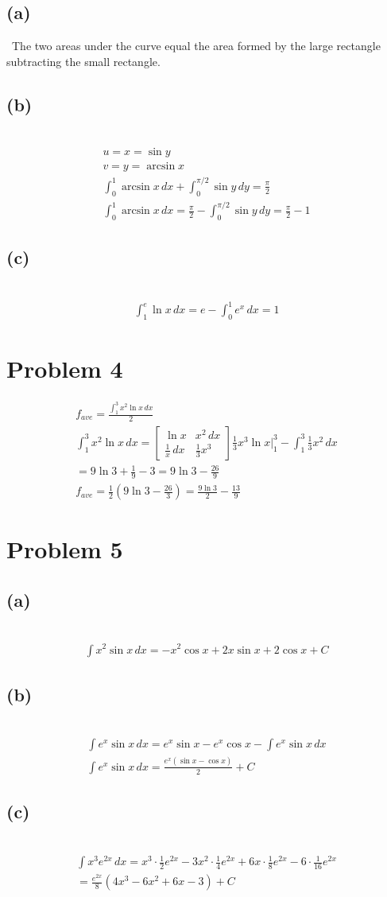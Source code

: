 \documentclass[12pt]{article}
\newcommand{\vem}{\vspace{0.5em}}
\newcommand{\problem}[1]{\section{Problem #1}}
\newcommand{\subproblem}[1]{\subsection{(#1)} \,}
\begin{document}
\subproblem{a}
The two areas under the curve equal the area formed by the large rectangle subtracting the small rectangle. \vem

\subproblem{b}
\begin{gather*}
    u=x=\sin y\\
    v=y=\arcsin x\\
    \int_0^1 \arcsin x\, dx+\int_0^{\pi /2} \sin y \, dy = \frac{\pi}{2}\\
    \int_0^1 \arcsin x\, dx = \frac{\pi }{2} - \int_0^{\pi /2} \sin y \, dy = \boxed{\frac{\pi}{2}-1}
\end{gather*}

\subproblem{c}
\begin{gather*}
    \int_1^e \ln x \, dx = e -\int_0^1 e^x\, dx = \boxed{1}
\end{gather*}

\problem{4}
\begin{gather*}
    f_{ave}=\frac{\int_1^3x^2\ln x\, dx}{2}\\
    \int_1^3x^2\ln x\, dx = 
    \begin{bmatrix}
        \ln x & x^2\, dx\\
        \frac{1}{x}\, dx & \frac{1}{3}x^3\,
    \end{bmatrix}
    \frac{1}{3}x^3\ln x\Big|^3_1 - \int_1^3 \frac{1}{3}x^2 \, dx\\
    = 9 \ln 3 + \frac{1}{9} - 3  = 9 \ln 3 - \frac{26}{9}\\
    f_{ave} = \frac{1}{2}(9 \ln 3 - \frac{26}{3}) = \boxed{\frac{9 \ln 3}{2}- \frac{13}{9}}
\end{gather*}

\problem{5}

\subproblem{a}
\begin{gather*}
    \int x^2 \sin x\, dx = \boxed{- x^2 \cos x + 2x \sin x + 2 \cos x +C}
\end{gather*}

\subproblem{b}
\begin{gather*}
    \int  e^x \sin x\, dx = e^x \sin x - e^x \cos x - \int  e^ x \sin x \, dx\\
    \int  e^x \sin x\, dx = \boxed{\frac{e^x (\sin x -\cos x )}{2}+C}
\end{gather*}

\subproblem{c}
\begin{gather*}
    \int x^3 e^{2x} \, dx = x^3 \cdot \frac{1}{2}e^{2x} - 3x^2 \cdot \frac{1}{4}e^{2x} + 6x \cdot \frac{1}{8}e^{2x} - 6 \cdot \frac{1}{16}e^{2x}\\
    = \boxed{\frac{e^{2x}}{8}(4x^3-6x^2+6x-3)+C}
\end{gather*}
\end{document}
